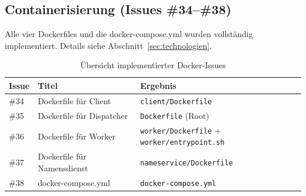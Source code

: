 \subsection{Containerisierung (Issues \#34--\#38)}

Alle vier Dockerfiles und die docker-compose.yml wurden vollständig
implementiert. Details siehe Abschnitt~\ref{sec:technologien}.

\begin{table}[H]
\centering
\begin{tabular}{lll}
\toprule
\textbf{Issue} & \textbf{Titel} & \textbf{Ergebnis} \\
\midrule
\#34 & Dockerfile für Client     & \texttt{client/Dockerfile} \\
\#35 & Dockerfile für Dispatcher & \texttt{Dockerfile} (Root) \\
\#36 & Dockerfile für Worker     & \texttt{worker/Dockerfile} + \texttt{worker/entrypoint.sh} \\
\#37 & Dockerfile für Namensdienst & \texttt{nameservice/Dockerfile} \\
\#38 & docker-compose.yml        & \texttt{docker-compose.yml} \\
\bottomrule
\end{tabular}
\caption{Übersicht implementierter Docker-Issues}
\end{table}
